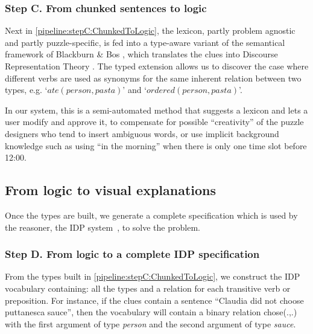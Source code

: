 \subsubsection*{Step C. From chunked sentences to logic} Next in \ref{pipeline:stepC:ChunkedToLogic}, the lexicon, partly problem agnostic and partly puzzle-specific, is fed into a type-aware variant of the semantical framework of Blackburn \& Bos \cite{Blackburn2005,Blackburn2006}, which translates the clues into Discourse Representation Theory \cite{DRT}.
The typed extension allows us to discover the case where different verbs are used as synonyms for the same inherent relation between two types, e.g. `$ate(person, pasta)$' and `$ordered(person, pasta)$'.

In our system, this is a semi-automated method that suggests a lexicon and lets a user modify and approve it, to compensate for possible ``creativity'' of the puzzle designers who tend to insert ambiguous words, or use implicit background knowledge such as using ``in the morning'' when there is only one time slot before 12:00.

\subsection{From logic to visual explanations}\label{sec:pipeline:IDPtoExplanations}
Once the types are built, we generate a complete specification which is used by the reasoner, the IDP system~\cite{IDP}, to solve the problem. 

\subsubsection*{Step D. From logic to a complete IDP specification}
From the types built in \ref{pipeline:stepC:ChunkedToLogic}, we construct the IDP vocabulary containing: all the types and a relation for each transitive verb or preposition. 
For instance, if the clues contain a sentence ``Claudia did not choose puttanesca sauce'', then the vocabulary will contain a binary relation chose(.,.) with the first argument of type \textit{person} and the second argument of type \textit{sauce}.

